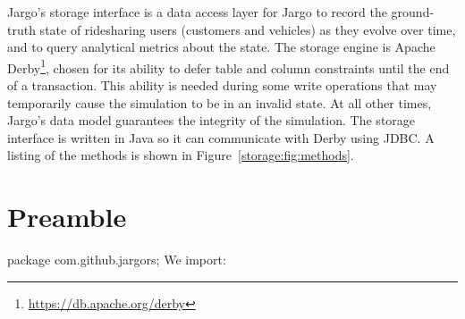 Jargo's storage interface is a data access layer for Jargo to record the
ground-truth state of ridesharing users (customers and vehicles) as they evolve
over time, and to query analytical metrics about the state.  The storage engine
is Apache Derby\footnote{\url{https://db.apache.org/derby}}, chosen for its
ability to defer table and column constraints until the end of a transaction.
This ability is needed during some write operations that may temporarily cause
the simulation to be in an invalid state. At all other times, Jargo's data
model guarantees the integrity of the simulation. The storage interface is
written in Java so it can communicate with Derby using JDBC. A listing of the
methods is shown in Figure~\ref{storage:fig:methods}.

\section{Preamble}
\nwenddocs{}\endmoddef{}
package com.github.jargors;
\nwendcode{}\nwdocspar
We import:
